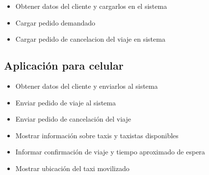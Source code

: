 \documentclass[a4paper]{article}
\begin{document}
\begin{itemize}
\item Obtener datos del cliente y cargarlos en el sistema
\item Cargar pedido demandado
\item Cargar pedido de cancelacion del viaje en sistema
\end{itemize}

\subsection{Aplicaci\'on para celular}
\begin{itemize}
\item Obtener datos del cliente y enviarlos al sistema
\item Enviar pedido de viaje al sistema
\item Enviar pedido de cancelaci\'on del viaje
\item Mostrar informaci\'on sobre taxis y taxistas disponibles
\item Informar confirmaci\'on de viaje y tiempo aproximado de espera
\item Mostrar ubicaci\'on del taxi movilizado 
\end{itemize}
\end{document}
